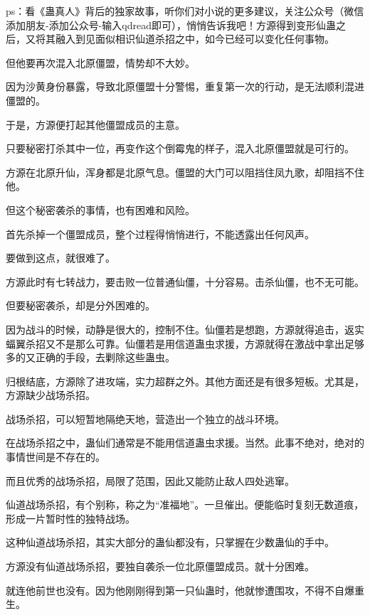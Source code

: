 
\begin{this_body}

ps：看《蛊真人》背后的独家故事，听你们对小说的更多建议，关注公众号（微信添加朋友-添加公众号-输入qdread即可），悄悄告诉我吧！方源得到变形仙蛊之后，又将其融入到见面似相识仙道杀招之中，如今已经可以变化任何事物。

但他要再次混入北原僵盟，情势却不大妙。

因为沙黄身份暴露，导致北原僵盟十分警惕，重复第一次的行动，是无法顺利混进僵盟的。

于是，方源便打起其他僵盟成员的主意。

只要秘密打杀其中一位，再变作这个倒霉鬼的样子，混入北原僵盟就是可行的。

方源在北原升仙，浑身都是北原气息。僵盟的大门可以阻挡住凤九歌，却阻挡不住他。

但这个秘密袭杀的事情，也有困难和风险。

首先杀掉一个僵盟成员，整个过程得悄悄进行，不能透露出任何风声。

要做到这点，就很难了。

方源此时有七转战力，要击败一位普通仙僵，十分容易。击杀仙僵，也不无可能。

但要秘密袭杀，却是分外困难的。

因为战斗的时候，动静是很大的，控制不住。仙僵若是想跑，方源就得追击，返实蝠翼杀招又不是那么可靠。仙僵若是用信道蛊虫求援，方源就得在激战中拿出足够多的又正确的手段，去剿除这些蛊虫。

归根结底，方源除了进攻端，实力超群之外。其他方面还是有很多短板。尤其是，方源缺少战场杀招。

战场杀招，可以短暂地隔绝天地，营造出一个独立的战斗环境。

在战场杀招之中，蛊仙们通常是不能用信道蛊虫求援。当然。此事不绝对，绝对的事情世间是不存在的。

而且优秀的战场杀招，局限了范围，因此又能防止敌人四处逃窜。

仙道战场杀招，有个别称，称之为“准福地”。一旦催出。便能临时复刻无数道痕，形成一片暂时性的独特战场。

这种仙道战场杀招，其实大部分的蛊仙都没有，只掌握在少数蛊仙的手中。

方源没有仙道战场杀招，要独自袭杀一位北原僵盟成员。就十分困难。

就连他前世也没有。因为他刚刚得到第一只仙蛊时，他就惨遭围攻，不得不自爆重生。


\end{this_body}
